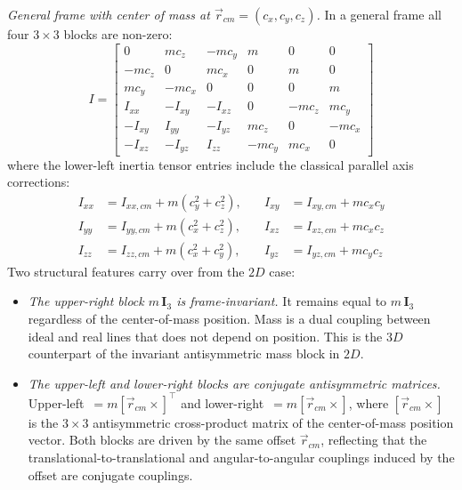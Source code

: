 \emph{General frame with center of mass at $\vec{r}_{cm} = (c_x, c_y, c_z)$.} In a general
frame all four $3\times3$ blocks are non-zero:
\begin{equation}
    I =
    \begin{bmatrix}
        0       &  m c_z   & -m c_y   &  m   &  0     &  0     \\
        -m c_z  &  0       &  m c_x   &  0   &  m     &  0     \\
         m c_y  & -m c_x   &  0       &  0   &  0     &  m     \\
        I_{xx}  & -I_{xy}  & -I_{xz}  &  0   & -m c_z &  m c_y \\
        -I_{xy} &  I_{yy}  & -I_{yz}  &  m c_z &  0   & -m c_x \\
        -I_{xz} & -I_{yz}  &  I_{zz}  & -m c_y &  m c_x &  0
    \end{bmatrix}
    \label{eq:inertia_3D_general}
\end{equation}
where the lower-left inertia tensor entries include the classical parallel axis
corrections:
\begin{align}
    I_{xx} &= I_{xx,cm} + m(c_y^2 + c_z^2), \quad &I_{xy} &
    = I_{xy,cm} + m c_x c_y \nonumber \\
    I_{yy} &= I_{yy,cm} + m(c_x^2 + c_z^2), \quad &I_{xz} &
    = I_{xz,cm} + m c_x c_z \label{eq:parallel_axis_3D} \\
    I_{zz} &= I_{zz,cm} + m(c_x^2 + c_y^2), \quad &I_{yz} &
    = I_{yz,cm} + m c_y c_z \nonumber
\end{align}
Two structural features carry over from the $2D$ case:
\begin{itemize}
    \item \emph{The upper-right block $m\,\mathbf{I}_3$ is frame-invariant.} It remains
    equal to $m\,\mathbf{I}_3$ regardless of the center-of-mass position. Mass is a dual
    coupling between ideal and real lines that does not depend on position. This is the
    $3D$ counterpart of the invariant antisymmetric mass block in $2D$.
    \item \emph{The upper-left and lower-right blocks are conjugate antisymmetric
    matrices.} Upper-left~$= m[\vec{r}_{cm}\times]^\top$ and lower-right~$=
    m[\vec{r}_{cm}\times]$, where $[\vec{r}_{cm}\times]$ is the $3\times3$ antisymmetric
    cross-product matrix of the center-of-mass position vector. Both blocks are driven by
    the same offset $\vec{r}_{cm}$, reflecting that the translational-to-translational and
    angular-to-angular couplings induced by the offset are conjugate couplings.
\end{itemize}

